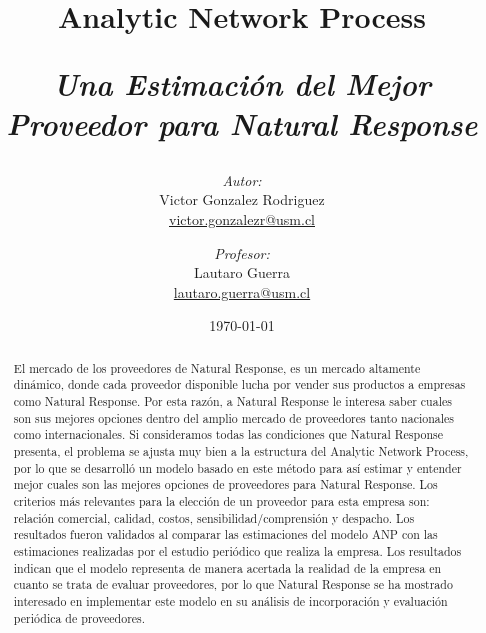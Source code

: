 \documentclass[12pt,letterpaper]{article}
\begin{document}
\begin{titlepage}
\title{Analytic Network Process \\ \begin{Large}\it Una Estimación del Mejor Proveedor para Natural Response\end{Large}} 
\author{\emph{Autor:}\\Victor Gonzalez Rodriguez\\\url{victor.gonzalezr@usm.cl} \\
\and \emph{Profesor:}\\Lautaro Guerra\\\url{lautaro.guerra@usm.cl}}
\date{\today}
\maketitle

\begin{abstract}
El mercado de los proveedores de Natural Response, es un mercado altamente dinámico, donde cada proveedor disponible lucha por vender sus productos a empresas como Natural Response. Por esta razón, a Natural Response le interesa saber cuales son sus mejores opciones dentro del amplio mercado de proveedores tanto nacionales como internacionales. Si consideramos todas las condiciones que Natural Response presenta, el problema se ajusta muy bien a la estructura del Analytic Network Process, por lo que se desarrolló un modelo basado en este método para así estimar y entender mejor cuales son las mejores opciones de proveedores para Natural Response. Los criterios más relevantes para la elección de un proveedor para esta empresa son: relación comercial, calidad, costos, sensibilidad/comprensión y despacho. Los resultados fueron validados al comparar las estimaciones del modelo ANP con las estimaciones realizadas por el estudio periódico que realiza la empresa. Los resultados indican que el modelo representa de manera acertada la realidad de la empresa en cuanto se trata de evaluar proveedores, por lo que Natural Response se ha mostrado interesado en implementar este modelo en su análisis de incorporación y evaluación periódica de proveedores.
\end{abstract}
\end{titlepage}
\newpage
\tableofcontents
\newpage
\end{document}
